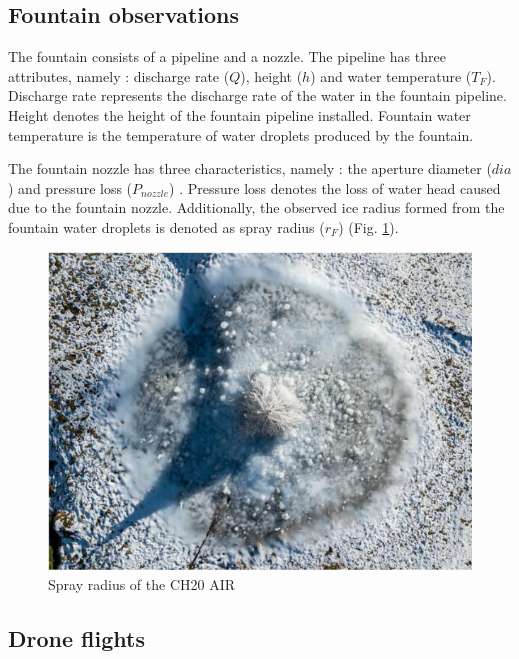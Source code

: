 \subsection{Fountain observations}

The fountain consists of a pipeline and a nozzle. The pipeline has three attributes, namely : discharge rate
($Q$), height ($h$) and water temperature ($T_F$). Discharge rate represents the discharge rate of the water in
the fountain pipeline. Height denotes the height of the fountain pipeline installed. Fountain water temperature
is the temperature of water droplets produced by the fountain.

The fountain nozzle has three characteristics, namely : the aperture diameter ($dia$) and pressure loss
($P_{nozzle}$) . Pressure loss denotes the loss of water head caused due to the fountain nozzle. Additionally,
the observed ice radius formed from the fountain water droplets is denoted as spray radius ($r_F$) (Fig.
\ref{fig:CH20_rad}). 

\begin{figure}[htb]
\centering
\includegraphics[width=\textwidth/2]{figs/CH20_sprayrad.jpg}
\caption{Spray radius of the CH20 AIR }
\label{fig:CH20_rad}
\end{figure}

\subsection{Drone flights}

